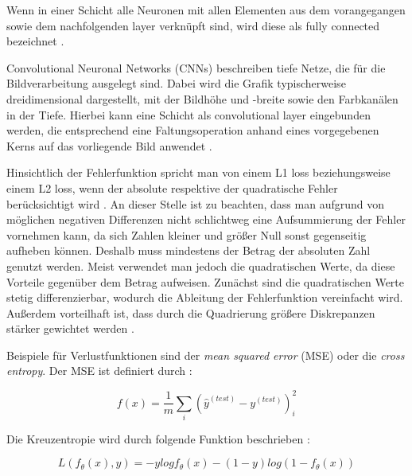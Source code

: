 \documentclass[12pt,a4paper]{article}
\begin{document}
Wenn in einer Schicht alle Neuronen mit allen Elementen aus dem vorangegangen sowie dem nachfolgenden layer verknüpft sind, wird diese als fully connected bezeichnet \cite[S. 79]{Sewak2019}.

Convolutional Neuronal Networks (CNNs) beschreiben tiefe Netze, die für die Bildverarbeitung ausgelegt sind. Dabei wird die Grafik typischerweise dreidimensional dargestellt, mit der Bildhöhe und -breite sowie den Farbkanälen in der Tiefe. Hierbei kann eine Schicht als convolutional layer eingebunden werden, die entsprechend eine Faltungsoperation anhand eines vorgegebenen Kerns auf das vorliegende Bild anwendet \cite[S. 85]{Sewak2019}.

Hinsichtlich der Fehlerfunktion spricht man von einem \glqq{}L1 loss\grqq{} beziehungsweise einem \glqq{}L2 loss\grqq{}, wenn der absolute respektive der quadratische Fehler berücksichtigt wird \cite[S. 82]{Sewak2019}. An dieser Stelle ist zu beachten, dass man aufgrund von möglichen negativen Differenzen nicht schlichtweg eine Aufsummierung der Fehler vornehmen kann, da sich Zahlen kleiner und größer Null sonst gegenseitig aufheben können. Deshalb muss mindestens der Betrag der absoluten Zahl genutzt werden. Meist verwendet man jedoch die quadratischen Werte, da diese Vorteile gegenüber dem Betrag aufweisen. Zunächst sind die quadratischen Werte stetig differenzierbar, wodurch die Ableitung der Fehlerfunktion vereinfacht wird. Außerdem vorteilhaft ist, dass durch die Quadrierung größere Diskrepanzen stärker gewichtet werden \cite[S. 41]{Kruse2015}.


Beispiele für Verlustfunktionen sind der \textit{mean squared error} (MSE) oder die \textit{cross entropy}.
Der MSE ist definiert durch \cite[S. 101]{Goodfellow2015}: 

\begin{equation}
f(x) = \frac{1}{m} \sum_{i} ( \hat{y}^{(test)} - y^{(test)} ) ^{2}_{i}
\end{equation}

Die Kreuzentropie wird durch folgende Funktion beschrieben \cite[S. 166]{Goodfellow2015}:

\begin{equation}
L(f_\theta (x), y) = -y log f_\theta (x) - (1 - y) log(1 - f_\theta(x))
\end{equation}
\end{document}
